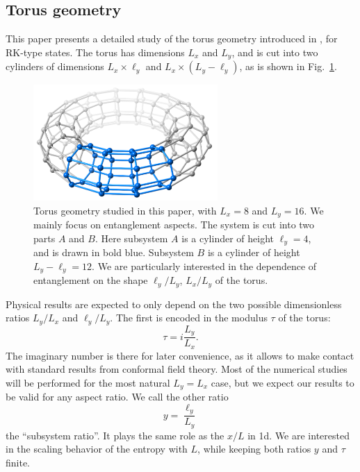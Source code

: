 \documentclass[11pt]{iopart}
\begin{document}
\subsection{Torus geometry}
\label{sec:geometry}
This paper presents a detailed study of the torus geometry introduced in \cite{Ju2012}, for RK-type states. The torus has dimensions $L_x$ and $L_y$, and is cut into two cylinders of dimensions $L_x \times \ell_y$ and $ L_x \times (L_y-\ell_y)$, as is shown in Fig.~\ref{fig:torus}.
\begin{figure}[ht]
 \begin{center}
  \includegraphics[width=7cm,angle=-90]{./figures/16x8b.pdf}
  \end{center}
  \caption{Torus geometry studied in this paper, with $L_x=8$ and $L_y=16$. We mainly focus on entanglement aspects. The system is cut into two parts $A$ and $B$. Here subsystem $A$ is a cylinder of height $\ell_y=4$, and is drawn in bold blue. Subsystem $B$ is a cylinder of height $L_y-\ell_y=12$. We are particularly interested in the dependence of entanglement on the shape $\ell_y/L_y$, $L_x/L_y$ of the torus.}
\label{fig:torus}
 \end{figure}
Physical results are expected to only depend on the two possible dimensionless ratios $L_y/L_x$ and $\ell_y/L_y$. The first is encoded in the modulus $\tau$ of the torus:
\begin{equation}
 \tau=i\frac{L_y}{L_x}.
\end{equation}
The imaginary number is there for later convenience, as it allows to make contact with standard results from conformal field theory. Most of the numerical studies will be performed for the most natural $L_y=L_x$ case, but we expect our results to be valid for any aspect ratio. We call the other ratio
\begin{equation}
 y=\frac{\ell_y}{L_y}
\end{equation}
the ``subsystem ratio''. It plays the same role as the $x/L$ in 1d. We are interested in the scaling behavior of the entropy with $L$, while keeping both ratios $y$ and $\tau$ finite. 
\end{document}
